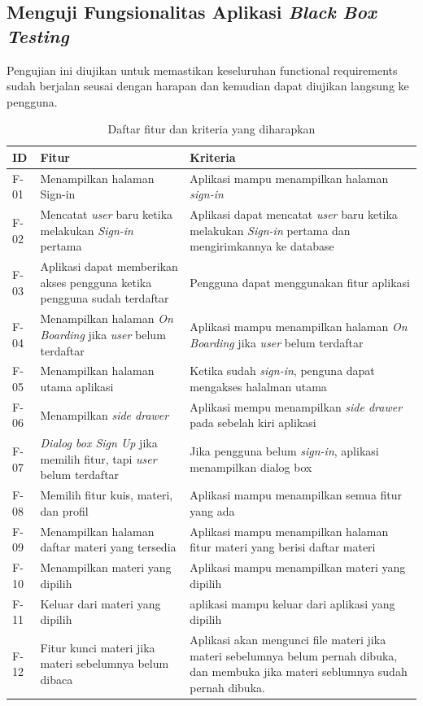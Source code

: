 \subsection{Menguji Fungsionalitas Aplikasi \textit{Black Box Testing}}
Pengujian ini diujikan untuk memastikan keseluruhan functional requirements sudah berjalan seusai dengan harapan dan kemudian dapat diujikan langsung ke pengguna.
\begin{table}[H]
	\centering
	\caption{Daftar fitur dan kriteria yang diharapkan}
	\begin{tabular}{|m{1cm}|p{}|p{}|}
		\hline
		\centering\textbf{ID} & \centering\textbf{Fitur} & \multicolumn{1}{m{0.45\textwidth}|}{\centering \textbf{Kriteria}} \\
		\hline
		F-01 &Menampilkan halaman Sign-in & Aplikasi mampu menampilkan halaman \textit{sign-in} \\
		\hline
		F-02 &Mencatat \textit{user} baru ketika melakukan \textit{Sign-in} pertama & Aplikasi dapat mencatat \textit{user} baru ketika melakukan \textit{Sign-in} pertama dan mengirimkannya ke database\\
		\hline
		F-03 &Aplikasi dapat memberikan akses pengguna ketika pengguna sudah terdaftar& Pengguna dapat menggunakan fitur aplikasi\\
		\hline
		F-04 &Menampilkan halaman \textit{On Boarding} jika \textit{user} belum terdaftar & Aplikasi mampu menampilkan halaman \textit{On Boarding} jika \textit{user} belum terdaftar  \\
		\hline
		F-05&Menampilkan halaman utama aplikasi& Ketika sudah \textit{sign-in}, penguna dapat mengakses halalman utama \\
		\hline
		F-06&Menampilkan \textit{side drawer}& Aplikasi mempu menampilkan \textit{side drawer} pada sebelah kiri aplikasi\\
		\hline
		F-07&\textit{Dialog box Sign Up} jika memilih fitur, tapi \textit{user} belum terdaftar& Jika pengguna belum \textit{sign-in}, aplikasi menampilkan dialog box \\
		\hline
		F-08&Memilih fitur kuis, materi, dan profil& Aplikasi mampu menampilkan semua fitur yang ada\\
		\hline
		F-09 &Menampilkan halaman daftar materi yang tersedia& Aplikasi mampu menampilkan halaman fitur materi yang berisi daftar materi \\
		\hline
		F-10&Menampilkan materi yang dipilih & Aplikasi mampu menampilkan materi yang dipilih\\
		\hline
		F-11&Keluar dari materi yang dipilih& aplikasi mampu keluar dari aplikasi yang dipilih\\
		\hline
		F-12&Fitur kunci materi jika materi sebelumnya belum dibaca& Aplikasi akan mengunci file materi jika materi sebelumnya belum pernah dibuka, dan membuka jika materi seblumnya sudah pernah dibuka. \\
		\hline
	\end{tabular}
\end{table}
